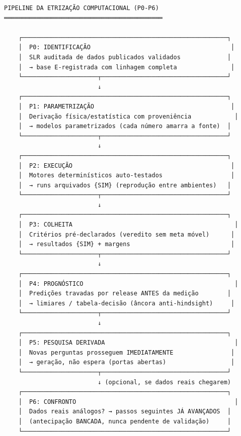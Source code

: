 \documentclass[
  12pt,
]{report}
\begin{document}
\begin{verbatim}
PIPELINE DA ETRIZAÇÃO COMPUTACIONAL (P0-P6)
════════════════════════════════════════════

    ┌─────────────────────────────────────────────────────────┐
    │  P0: IDENTIFICAÇÃO                                       │
    │  SLR auditada de dados publicados validados             │
    │  → base E-registrada com linhagem completa               │
    └─────────────────────┬───────────────────────────────────┘
                          ↓
    ┌─────────────────────────────────────────────────────────┐
    │  P1: PARAMETRIZAÇÃO                                      │
    │  Derivação física/estatística com proveniência            │
    │  → modelos parametrizados (cada número amarra a fonte)  │
    └─────────────────────┬───────────────────────────────────┘
                          ↓
    ┌─────────────────────────────────────────────────────────┐
    │  P2: EXECUÇÃO                                            │
    │  Motores determinísticos auto-testados                   │
    │  → runs arquivados {SIM} (reprodução entre ambientes)   │
    └─────────────────────┬───────────────────────────────────┘
                          ↓
    ┌─────────────────────────────────────────────────────────┐
    │  P3: COLHEITA                                             │
    │  Critérios pré-declarados (veredito sem meta móvel)      │
    │  → resultados {SIM} + margens                            │
    └─────────────────────┬───────────────────────────────────┘
                          ↓
    ┌─────────────────────────────────────────────────────────┐
    │  P4: PROGNÓSTICO                                          │
    │  Predições travadas por release ANTES da medição        │
    │  → limiares / tabela-decisão (âncora anti-hindsight)     │
    └─────────────────────┬───────────────────────────────────┘
                          ↓
    ┌─────────────────────────────────────────────────────────┐
    │  P5: PESQUISA DERIVADA                                    │
    │  Novas perguntas prosseguem IMEDIATAMENTE                │
    │  → geração, não espera (portas abertas)                  │
    └─────────────────────┬───────────────────────────────────┘
                          ↓ (opcional, se dados reais chegarem)
    ┌─────────────────────────────────────────────────────────┐
    │  P6: CONFRONTO                                            │
    │  Dados reais análogos? → passos seguintes JÁ AVANÇADOS  │
    │  (antecipação BANCADA, nunca pendente de validação)     │
    └─────────────────────────────────────────────────────────┘
\end{verbatim}
\end{document}
